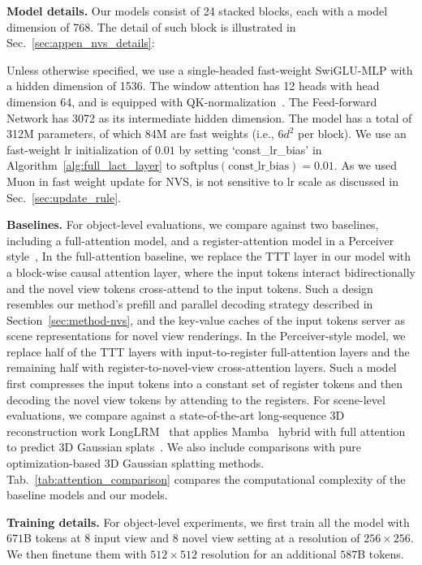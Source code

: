 \documentclass{article}
\begin{document}
\noindent\textbf{Model details.}
Our models consist of 24 stacked \methodname{} blocks, each with a model dimension of 768. 
The detail of such block is illustrated in Sec.~\ref{sec:appen_nvs_details}:

Unless otherwise specified, we use a single-headed fast-weight SwiGLU-MLP with a hidden dimension of 1536. 
The window attention has 12 heads with head dimension 64, and is equipped with QK-normalization~\cite{henry2020query}.
The Feed-forward Network has 3072 as its intermediate hidden dimension.
The model has a total of 312M parameters, of which 84M are fast weights (i.e., $6 d^2$ per block).
We use an fast-weight lr initialization of $0.01$ by setting `const\_lr\_bias' in Algorithm~\ref{alg:full_lact_layer} to $\mathrm{softplus}(\text{const\_lr\_bias}) = 0.01$.
As we used Muon in fast weight update for NVS, \methodname{} is not sensitive to lr scale as discussed in Sec.~\ref{sec:update_rule}.

\noindent\textbf{Baselines.}
For object-level evaluations, we compare against two baselines, including a full-attention model, 
and a register-attention model in a Perceiver style~\cite{jaegle2021perceiver}, 
In the full-attention baseline, we 
replace the TTT layer in our model with a block-wise causal attention layer, where 
the input tokens interact bidirectionally and the novel view tokens cross-attend 
to the input tokens. Such a design resembles our method's prefill and parallel 
decoding strategy described in Section~\ref{sec:method-nvs}, and the key-value caches 
of the input tokens server as scene representations for novel view renderings. 
In the Perceiver-style model, we replace half of the TTT layers with 
input-to-register full-attention layers and the remaining half with register-to-novel-view
cross-attention layers. Such a model first compresses the input tokens into a constant 
set of register tokens and then decoding the novel view tokens by attending to the registers.
For scene-level evaluations, we compare against a state-of-the-art long-sequence 3D 
reconstruction work LongLRM~\cite{ziwen2024long} that applies Mamba~\cite{gu2023mamba} hybrid with full attention to predict 
3D Gaussian splats~\cite{kerbl20233d}. 
We also include comparisons with pure optimization-based 3D Gaussian splatting methods.
Tab.~\ref{tab:attention_comparison} compares the computational complexity of the 
baseline models and our models. 

\noindent\textbf{Training details.}
For object-level experiments, we first train all the model with $671$B tokens at 8 input view and 8 novel view setting at a resolution of $256\times256$. 
We then finetune them with $512\times512$ resolution for an additional $587$B tokens. 
\end{document}
